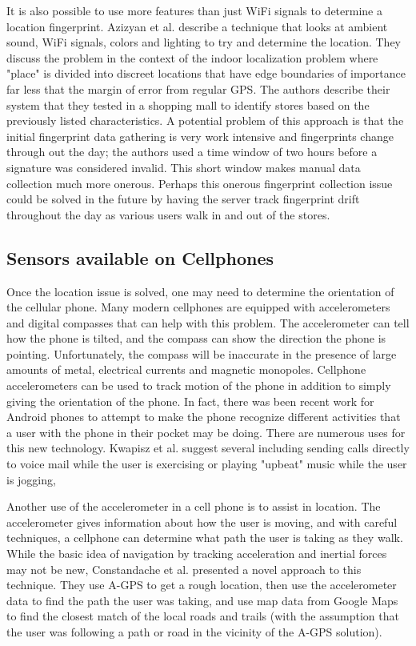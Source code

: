 \documentclass{acm_proc_article-sp}
\begin{document}
It is also possible to use more features than just WiFi signals to determine a location fingerprint. Azizyan et al. describe a technique that looks at ambient sound, WiFi signals, colors and lighting to try and determine the location.   They discuss the problem in the context of the indoor localization problem where "place" is divided into discreet locations that have edge boundaries of importance far less that the margin of error from regular GPS.  The authors describe their system that they tested in a shopping mall to identify stores based on the previously listed characteristics.  A potential problem of this approach is that the initial fingerprint data gathering is very work intensive and fingerprints change through out the day; the authors used a time window of two hours before a signature was considered invalid.  This short window makes manual data collection much more onerous. \cite{azizyan2009surroundsense}  Perhaps this onerous fingerprint collection issue could be solved in the future by having the server track fingerprint drift throughout the day as various users walk in and out of the stores.

\subsection{Sensors available on Cellphones}

Once the location issue is solved, one may need to determine the orientation of the cellular phone. Many modern cellphones are equipped with  accelerometers and digital compasses that can help with this problem.  The accelerometer can tell how the phone is tilted, and the compass can show the direction the phone is pointing.  Unfortunately, the compass will be inaccurate in the presence of large amounts of metal, electrical currents \cite{karpischek2009swisspeaks} and magnetic monopoles.  Cellphone accelerometers can be used to track motion of the phone in addition to simply giving the orientation of the phone.  In fact, there was been recent work for Android phones to attempt to make the phone recognize different activities that a user with the phone in their pocket may be doing.  \cite{kwapisz2010activity}  There are numerous uses for this new technology.  Kwapisz et al. suggest several including sending calls directly to voice mail while the user is exercising or playing "upbeat" music while the user is jogging,

Another use of the accelerometer in a cell phone is to assist in location.  The accelerometer gives information about how the user is moving, and with careful techniques, a cellphone can determine what path the user is taking as they walk. While the basic idea of navigation by tracking acceleration and inertial forces may not be new, \cite{farrell1999global} \cite{gustafsson2002particle} Constandache et al. presented a novel approach to this technique. They use A-GPS to get a rough location, then use the accelerometer data to find the path the user was taking, and use map data from Google Maps to find the closest match of the local roads and trails (with the assumption that the user was following a path or road in the vicinity of the A-GPS solution).   \cite{constandache2010towards}
\end{document}
